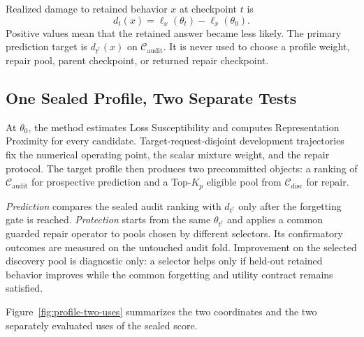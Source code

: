 Realized damage to retained behavior $x$ at checkpoint $t$ is
\begin{equation}
  d_t(x)=\ell_x(\theta_t)-\ell_x(\theta_0).
  \label{eq:realized-damage}
\end{equation}
Positive values mean that the retained answer became less likely. The primary
prediction target is $d_{t^\dagger}(x)$ on
$\mathcal C_{\mathrm{audit}}$. It is never used to choose a profile weight,
repair pool, parent checkpoint, or returned repair checkpoint.

\subsection{One Sealed Profile, Two Separate Tests}

At $\theta_0$, the method estimates Loss Susceptibility and
computes Representation Proximity for every candidate. Target-request-disjoint development
trajectories fix the numerical operating point, the scalar mixture weight, and
the repair protocol. The target profile then produces two precommitted
objects: a ranking of $\mathcal C_{\mathrm{audit}}$ for prospective prediction
and a Top-$K_p$ eligible pool from $\mathcal C_{\mathrm{disc}}$ for repair.

\emph{Prediction} compares the sealed audit ranking with
$d_{t^\dagger}$ only after the forgetting gate is reached.
\emph{Protection} starts from the same $\theta_{t^\dagger}$ and applies a
common guarded repair operator to pools chosen by different selectors. Its
confirmatory outcomes are measured on the untouched audit fold. Improvement
on the selected discovery pool is diagnostic only: a selector helps only if
held-out retained behavior improves while the common forgetting and utility
contract remains satisfied.

Figure~\ref{fig:profile-two-uses} summarizes the two coordinates and the two
separately evaluated uses of the sealed score.
